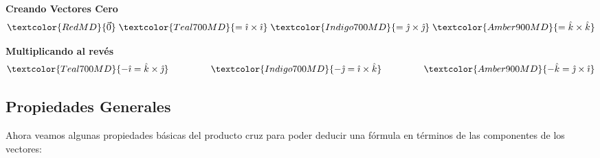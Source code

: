 \documentclass[12pt, fleqn]{report}                             %
\DeclareMathOperator \MegaSpace {\quad \quad}                   %
\theoremstyle{break}                                            %
\newcommand{\hati}      {\hat{\imath}}                           %
\newcommand{\hatj}      {\hat{\jmath}}                           %
\newcommand{\hatk}      {\hat{k}}                                %
\begin{document}
                \textbf{Creando Vectores Cero}
                    \begin{align*}
                        \textcolor{RedMD}
                            {\vec{0}}
                            \;
                        \textcolor{Teal700MD}
                            { = \hati \times \hati}
                            \;
                        \textcolor{Indigo700MD}
                            { = \hatj \times \hatj}
                            \;
                        \textcolor{Amber900MD}
                            { = \hatk \times \hatk}
                    \end{align*}

                \textbf{Multiplicando al revés}
                    \begin{align*}
                        \textcolor{Teal700MD}
                        {-\hati = \hatk \times \hatj}
                            \MegaSpace \MegaSpace
                        \textcolor{Indigo700MD}
                        {-\hatj = \hati \times \hatk}
                            \MegaSpace \MegaSpace
                        \textcolor{Amber900MD}
                        {-\hatk = \hatj \times \hati}
                    \end{align*}
            
            \clearpage
            \subsection{Propiedades Generales}

                Ahora veamos algunas propiedades básicas del producto cruz para poder deducir una fórmula
                en términos de las componentes de los vectores:
                
\end{document}
